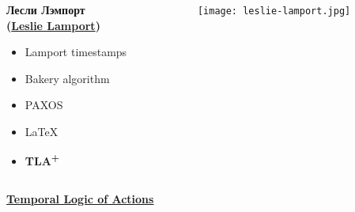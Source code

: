 \documentclass[
  11pt,aspectratio=1610,pdf,hyperref={unicode,colorlinks=false}
]{beamer}
\def\TLA{TLA\textsuperscript{+}}
\begin{document}
\begin{frame}[c]
  \begin{columns}
    \begin{column}{.45\textwidth}      
      {\Large\bf
        Лесли Лэмпорт\\
        (\href{https://lamport.azurewebsites.net}{Leslie Lamport})
      }\\
      \vspace{3ex}
      \large
      \vspace{1ex}
      \begin{itemize}
        \item Lamport timestamps
        \item Bakery algorithm
        \item PAXOS
        \item LaTeX
        \item {\bf \TLA}
      \end{itemize}
    \end{column}
    \begin{column}{.5\textwidth}
      \centering
      \texttt{[image: leslie-lamport.jpg]}
    \end{column}
  \end{columns}
\end{frame}  

\begin{frame}[c]  
  \centering\Large\bf
  \href{https://lamport.azurewebsites.net/pubs/lamport-actions.pdf}{Temporal Logic of Actions}
\end{frame}
\end{document}
